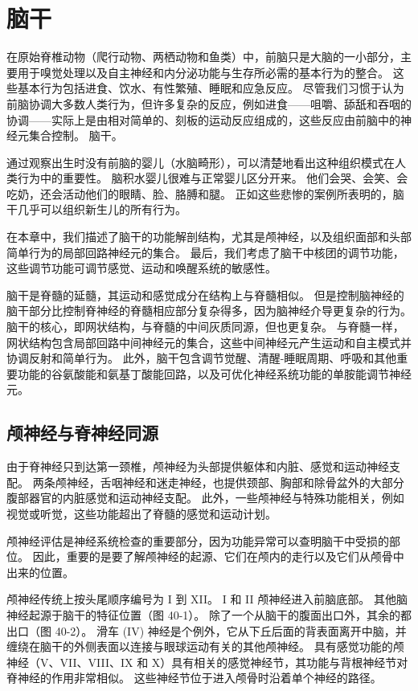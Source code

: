\chapter{脑干} \label{chap:chap40}
在原始脊椎动物（爬行动物、两栖动物和鱼类）中，前脑只是大脑的一小部分，主要用于嗅觉处理以及自主神经和内分泌功能与生存所必需的基本行为的整合。 这些基本行为包括进食、饮水、有性繁殖、睡眠和应急反应。 尽管我们习惯于认为前脑协调大多数人类行为，但许多复杂的反应，例如进食——咀嚼、舔舐和吞咽的协调——实际上是由相对简单的、刻板的运动反应组成的，这些反应由前脑中的神经元集合控制。 脑干。

通过观察出生时没有前脑的婴儿（水脑畸形），可以清楚地看出这种组织模式在人类行为中的重要性。 脑积水婴儿很难与正常婴儿区分开来。 他们会哭、会笑、会吃奶，还会活动他们的眼睛、脸、胳膊和腿。 正如这些悲惨的案例所表明的，脑干几乎可以组织新生儿的所有行为。

在本章中，我们描述了脑干的功能解剖结构，尤其是颅神经，以及组织面部和头部简单行为的局部回路神经元的集合。 最后，我们考虑了脑干中核团的调节功能，这些调节功能可调节感觉、运动和唤醒系统的敏感性。

脑干是脊髓的延髓，其运动和感觉成分在结构上与脊髓相似。 但是控制脑神经的脑干部分比控制脊神经的脊髓相应部分复杂得多，因为脑神经介导更复杂的行为。 脑干的核心，即网状结构，与脊髓的中间灰质同源，但也更复杂。 与脊髓一样，网状结构包含局部回路中间神经元的集合，这些中间神经元产生运动和自主模式并协调反射和简单行为。 此外，脑干包含调节觉醒、清醒-睡眠周期、呼吸和其他重要功能的谷氨酸能和氨基丁酸能回路，以及可优化神经系统功能的单胺能调节神经元。

\section{颅神经与脊神经同源}
由于脊神经只到达第一颈椎，颅神经为头部提供躯体和内脏、感觉和运动神经支配。 两条颅神经，舌咽神经和迷走神经，也提供颈部、胸部和除骨盆外的大部分腹部器官的内脏感觉和运动神经支配。 此外，一些颅神经与特殊功能相关，例如视觉或听觉，这些功能超出了脊髓的感觉和运动计划。

颅神经评估是神经系统检查的重要部分，因为功能异常可以查明脑干中受损的部位。 因此，重要的是要了解颅神经的起源、它们在颅内的走行以及它们从颅骨中出来的位置。

颅神经传统上按头尾顺序编号为 I 到 XII。 I 和 II 颅神经进入前脑底部。 其他脑神经起源于脑干的特征位置（图 40-1）。 除了一个从脑干的腹面出口外，其余的都出口（图 40-2）。 滑车 (IV) 神经是个例外，它从下丘后面的背表面离开中脑，并缠绕在脑干的外侧表面以连接与眼球运动有关的其他颅神经。 具有感觉功能的颅神经（V、VII、VIII、IX 和 X）具有相关的感觉神经节，其功能与背根神经节对脊神经的作用非常相似。 这些神经节位于进入颅骨时沿着单个神经的路径。

